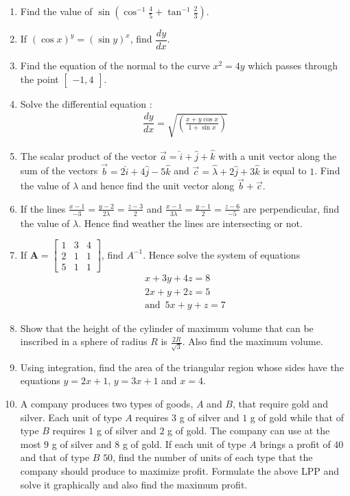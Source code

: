 \documentclass[2pt,-letter paper]{article}
\let\vec\mathbf{}
\let\vec\mathbf{}
\let\vec\mathbf{}
\providecommand{\myvec}[1]{\ensuremath{\begin{bmatrix}#1\end{bmatrix}}}
\providecommand{\brak}[1]{\ensuremath{\left(#1\right)}}
\begin{document}
\begin{enumerate}
\item Find the value of $\sin\brak{\cos^{-1}{\frac{4}{5}}+{\tan^{-1}{\frac{2}{3}}}}$.
\item If $\brak{\cos x}^y = \brak{\sin y }^x$, find $\dfrac{dy}{dx}$.
\item  Find the equation of the normal to the curve ${x}^2 = 4y$ which passes through the point $\myvec{-1,4}$. 
\item Solve the differential equation : 
\begin{align*}
\dfrac{dy}{dx}= \sqrt{\brak{\frac{x+y\cos x}{1+\sin x}}}
\end{align*}
\item The scalar product of the vector $\overrightarrow{a} = \hat{i}+\hat{j}+\hat{k}$ with a unit vector along the sum of the vectors $\overrightarrow{b} = 2\hat{i}+4\hat{j}-5\hat{k}$ and $\overrightarrow{c} = \hat{\lambda}+2\hat{j}+3\hat{k}$ is equal to $1$. Find the value of $\lambda$ and hence find the unit vector along $\overrightarrow{b}+\overrightarrow{c}$.
\item If the lines $\frac{x-1}{-3}=\frac{y-2}{2\lambda}=\frac{z-3}{2}$ and $\frac{x-1}{3\lambda}=\frac{y-1}{2}=\frac{z-6}{-5}$ are perpendicular, find the value of $\lambda$. Hence find weather the lines are intersecting or not.
\item If ${\vec{A}} = \myvec{1&3&4\\2&1&1\\5&1&1}$, find $A^{-1}$.
        Hence solve the system of equations 
		\begin{align*}
                {x+3y+4z}=8 \\
                {2x+y+2z}=5 \\
            \text{and}\hspace{6pt} {5x+y+z}=7
            \end{align*} 
\item  Show that the height of the cylinder of maximum volume that can be inscribed in a sphere of radius $R$ is $\frac{2R}{\sqrt{3}}$. Also find the maximum volume.
 \item Using integration, find the area of the triangular region whose sides have the equations ${y}={2x}+1$, ${y}={3x}+1$ and ${x}=4$.
\item  A company produces two types of goods, $A$ and $B$, that require gold and silver. Each unit of type $A$ requires $3$ g of silver and $1$ g of gold while that of type $B$ requires $1$ g of silver and $2$ g of gold. The company can use at the most $9$ g of silver and $8$ g of gold. If each unit of type $A$ brings a profit of \rupee $40$ and that of type $B$ \rupee $50$, find the number of units of each type that the company should produce to maximize profit. Formulate the above LPP and solve it graphically and also find the maximum profit.
\end{enumerate}
\end{document}
